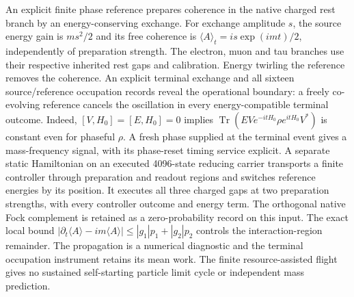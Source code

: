 An explicit finite phase reference prepares coherence in the native charged
rest branch by an energy-conserving exchange. For exchange amplitude $s$,
the source energy gain is $ms^2/2$ and its free coherence is
$\langle A\rangle_t=is\exp(imt)/2$, independently of preparation strength.
The electron, muon and tau branches use their respective inherited rest
gaps and calibration. Energy twirling the reference removes the coherence.
An explicit terminal exchange and all sixteen source/reference occupation
records reveal the operational boundary: a freely co-evolving reference
cancels the oscillation in every energy-compatible terminal outcome.
Indeed, $[V,H_0]=[E,H_0]=0$ implies
$\operatorname{Tr}(EVe^{-itH_0}\rho e^{itH_0}V^*)$
is constant even for phaseful $\rho$. A fresh phase supplied at the terminal
event gives a mass-frequency signal, with its phase-reset timing service
explicit. A separate static Hamiltonian on an executed 4096-state reducing
carrier transports a finite
controller through preparation and readout regions and switches reference
energies by its position. It executes all three charged gaps at two
preparation strengths, with every controller outcome and energy term. The
orthogonal native Fock complement is retained as a zero-probability record
on this input.
The exact local bound
$|\partial_t\langle A\rangle-im\langle A\rangle|
\leq |g_1|p_1+|g_2|p_2$
controls the interaction-region remainder. The propagation is a numerical
diagnostic and the terminal occupation instrument retains its mean work.
The finite resource-assisted flight gives no sustained self-starting
particle limit cycle or independent mass prediction.
